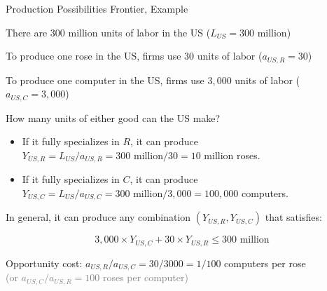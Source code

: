 \documentclass[notes,11pt, aspectratio=169, xcolor=table]{beamer}
\newenvironment{wideitemize}{\itemize\addtolength{\itemsep}{10pt}}{\enditemize}
\begin{document}
\begin{frame}{Production Possibilities Frontier, Example}
\begin{wideitemize}
        \item There are 300 million units of labor in the US ($L_{US} = 300$ million)
        \item<2-> To produce one rose in the US, firms use $30$ units of labor ($a_{US,R} = 30$)
        \item<3-> To produce one computer in the US, firms use $3,000$ units of labor ($a_{US,C} = 3,000$)
        \item<4-> How many units of either good can the US make?
        \begin{itemize}
            \item<4-> If it fully specializes in $R$, it can produce $Y_{US,R}=L_{US}/a_{US,R} = 300 \text{ million}/30 = 10 \text{ million}$ roses.
            \item<4-> If it fully specializes in $C$, it can produce $Y_{US,C}=L_{US}/a_{US,C} = 300 \text{ million}/3,000 = 100,000$ computers.
        \end{itemize}

        \item<5-> In general, it can produce any combination $(Y_{US,R}, Y_{US,C})$ that satisfies:

        \begin{equation*}
            3,000 \times Y_{US,C} + 30 \times Y_{US,R} \le 300 \text{ million}
        \end{equation*}
    \item<6-> Opportunity cost: $a_{US,R}/a_{US,C} = 30/3000 = 1/100$ computers per rose \\
    \qquad \textcolor{gray}{(or $a_{US,C}/a_{US,R} = 100$ roses per computer)}
    \end{wideitemize}
\end{frame}
\end{document}
